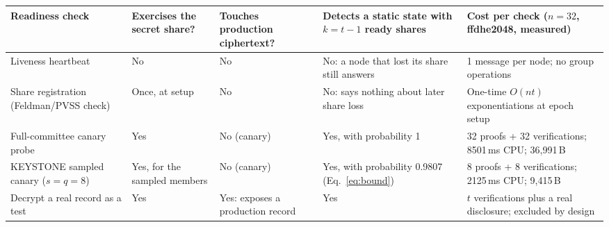 \begin{tabularx}{\textwidth}{@{}>{\raggedright\arraybackslash}p{}>{\raggedright\arraybackslash}p{}>{\raggedright\arraybackslash}p{}>{\raggedright\arraybackslash}p{}X@{}}
\toprule
Readiness check & Exercises the secret share? & Touches production ciphertext? & Detects a static state with $k=t-1$ ready shares & Cost per check ($n=32$, ffdhe2048, measured)\\
\midrule
Liveness heartbeat & No & No & No: a node that lost its share still answers & 1 message per node; no group operations\\
Share registration (Feldman/PVSS check) & Once, at setup & No & No: says nothing about later share loss & One-time $O(nt)$ exponentiations at epoch setup\\
Full-committee canary probe & Yes & No (canary) & Yes, with probability 1 & 32 proofs + 32 verifications; 8501\,ms CPU; 36,991\,B\\
KEYSTONE sampled canary ($s=q=8$) & Yes, for the sampled members & No (canary) & Yes, with probability 0.9807 (Eq.~\ref{eq:bound}) & 8 proofs + 8 verifications; 2125\,ms CPU; 9,415\,B\\
Decrypt a real record as a test & Yes & Yes: exposes a production record & Yes & $t$ verifications plus a real disclosure; excluded by design\\
\bottomrule
\end{tabularx}
